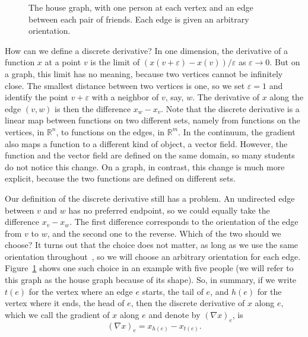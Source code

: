 \documentclass[11pt,a4paper]{article}
\theoremstyle{plain}
\theoremstyle{definition}
\newcommand{\R}{\mathbb{R}}
\begin{document}
\begin{figure}[t]
\centering
{}
\caption{The house graph, with one person at each vertex and an edge between each pair of friends. Each edge is given an arbitrary orientation.}
\label{fig:house}
\end{figure}

How can we define a discrete derivative? In one dimension, the derivative of a function $x$ at a point $v$ is the limit of $(x(v+\varepsilon)-x(v))/\varepsilon$ as $\varepsilon\to0$. But on a graph, this limit has no meaning, because two vertices cannot be infinitely close. The smallest distance between two vertices is one, so we set $\varepsilon=1$ and identify the point $v+\varepsilon$ with a neighbor of $v$, say, $w$. The derivative of $x$ along the edge $(v,w)$ is then the difference $x_w-x_v$. Note that the discrete derivative is a linear map between functions on two different sets, namely from functions on the vertices, in $\R^n$, to functions on the edges, in $\R^m$. In the continuum, the gradient also maps a function to a different kind of object, a vector field. However, the function and the vector field are defined on the same domain, so many students do not notice this change. On a graph, in contrast, this change is much more explicit, because the two functions are defined on different sets.

Our definition of the discrete derivative still has a problem. An undirected edge between $v$ and $w$ has no preferred endpoint, so we could equally take the difference $x_v-x_w$. The first difference corresponds to the orientation of the edge from $v$ to $w$, and the second one to the reverse. Which of the two should we choose? It turns out that the choice does not matter, as long as we use the same orientation throughout~\cite{biggs1993}, so we will choose an arbitrary orientation for each edge. Figure~\ref{fig:house} shows one such choice in an example with five people (we will refer to this graph as the house graph because of its shape). So, in summary, if we write $t(e)$ for the vertex where an edge $e$ starts, the tail of $e$, and $h(e)$ for the vertex where it ends, the head of $e$, then the discrete derivative of $x$ along $e$, which we call the gradient of $x$ along $e$ and denote by $(\nabla x)_e$, is
\[
(\nabla x)_e=x_{h(e)}-x_{t(e)}.
\]
\end{document}
